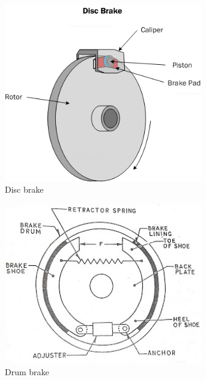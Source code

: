 \begin{figure}[H]
	\begin{subfigure}[b]{.32\linewidth}
		\includegraphics[width=0.95\textwidth]{imgs/brake_disc.png}
		\caption{Disc brake}
	\end{subfigure}\begin{subfigure}[b]{.32\linewidth}
		\includegraphics[width=0.95\textwidth]{imgs/brake_drum.jpeg}
		\caption{Drum brake}
	\end{subfigure}\begin{subfigure}[b]{.32\linewidth}

\end{subfigure}
\end{figure}
